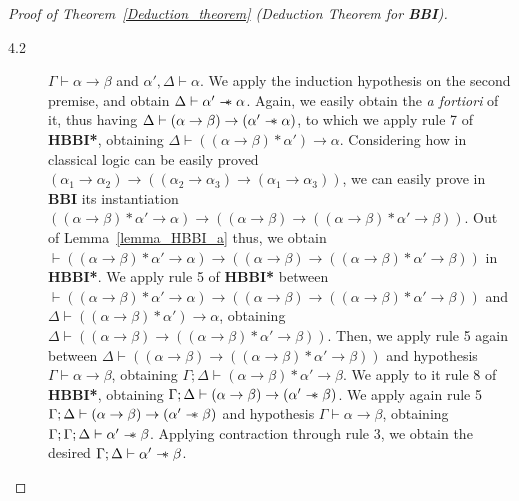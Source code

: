 \documentclass[a4paper]{article}
\newcommand\magicwand{\mathrel{-\mkern-6mu*}}
\newcommand{\BBI}{\textbf{BBI}\xspace}
\begin{document}
\begin{proof}[Proof of Theorem~\ref{Deduction_theorem} (Deduction Theorem for \BBI)]
\begin{description}
\begin{description}
\item[4.2] $\Gamma \vdash \alpha \rightarrow \beta$ and $\alpha', \Delta\vdash \alpha$. We apply the induction hypothesis on the second premise, and obtain $\Delta \vdash \alpha' \magicwand \alpha$. Again, we easily obtain the \textit{a fortiori} of it, thus having $\Delta \vdash (\alpha \rightarrow \beta) \rightarrow (\alpha' \magicwand \alpha)$, to which we apply rule 7 of \textbf{HBBI*}, obtaining $\Delta \vdash ((\alpha \rightarrow \beta)* \alpha') \rightarrow \alpha$. Considering how in classical logic can be easily proved $(\alpha_1 \rightarrow \alpha_2) \rightarrow ((\alpha_2 \rightarrow \alpha_3)\rightarrow (\alpha_1 \rightarrow \alpha_3))$, we can easily prove in \BBI its instantiation $((\alpha \rightarrow \beta)*\alpha' \rightarrow \alpha)\rightarrow ((\alpha \rightarrow \beta)\rightarrow((\alpha \rightarrow \beta)*\alpha'\rightarrow \beta))$. Out of Lemma~\ref{lemma_HBBI_a} thus, we obtain $\vdash((\alpha \rightarrow \beta)*\alpha' \rightarrow \alpha)\rightarrow ((\alpha \rightarrow \beta)\rightarrow((\alpha \rightarrow \beta)*\alpha'\rightarrow \beta))$ in \textbf{HBBI*}. We apply rule 5 of \textbf{HBBI*} between $\vdash((\alpha \rightarrow \beta)*\alpha' \rightarrow \alpha)\rightarrow ((\alpha \rightarrow \beta)\rightarrow((\alpha \rightarrow \beta)*\alpha'\rightarrow \beta))$ and $\Delta \vdash ((\alpha \rightarrow \beta)* \alpha') \rightarrow \alpha$, obtaining $\Delta\vdash ((\alpha \rightarrow \beta)\rightarrow((\alpha \rightarrow \beta)*\alpha'\rightarrow \beta))$. Then, we apply rule 5 again between $\Delta\vdash ((\alpha \rightarrow \beta)\rightarrow((\alpha \rightarrow \beta)*\alpha'\rightarrow \beta))$ and hypothesis $\Gamma \vdash \alpha \rightarrow \beta$, obtaining $\Gamma; \Delta \vdash (\alpha \rightarrow \beta)*\alpha'\rightarrow \beta$. We apply to it rule 8 of \textbf{HBBI*}, obtaining $\Gamma; \Delta \vdash (\alpha \rightarrow \beta)\rightarrow(\alpha'\magicwand \beta)$. We apply again rule 5 $\Gamma; \Delta \vdash (\alpha \rightarrow \beta)\rightarrow(\alpha'\magicwand \beta)$ and hypothesis $\Gamma \vdash \alpha \rightarrow \beta$, obtaining $\Gamma; \Gamma; \Delta \vdash \alpha' \magicwand \beta$. Applying contraction through rule 3, we obtain the desired $\Gamma; \Delta \vdash \alpha' \magicwand \beta$.
    
\end{description}
    

        


\end{description}
\end{proof}
\end{document}
